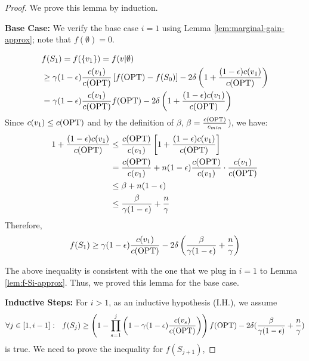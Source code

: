 \documentclass[10pt]{article} %
\theoremstyle{remark}
\newcommand{\OPT}{{\rm OPT}}
\begin{document}
\begin{proof} 
We prove this lemma by induction. 


\textbf{Base Case: }
We verify the base case $i=1$ using Lemma \ref{lem:marginal-gain-approx}; note that
$f(\emptyset) = 0$.

\begin{align*}
    &f(S_1) = f(\{v_1\})=f(v|\emptyset) \\
    &\geq \gamma(1-\epsilon)\frac{c(v_1)}{c(\OPT)} \left[ f(\OPT)-f(S_{0})\right] - 2\delta  \left( 1+\frac{(1-\epsilon)c(v_1)}{ c(\OPT)} \right)\\
    &=\gamma(1-\epsilon)\frac{c(v_1)}{c(\OPT)}  f(\OPT) - 2\delta  \left( 1+\frac{(1-\epsilon)c(v_1)}{ c(\OPT)} \right)
\end{align*}
Since $c(v_1) \leq c(\OPT)$ and by the definition of $\beta$, $\beta = \frac{c(\OPT)}{c_{min}}$), we have:
\begin{align*}
    1+\frac{(1-\epsilon)c(v_1)}{ c(\OPT)} &\leq \frac{c(\OPT)}{c(v_1)} \left[ 1+\frac{(1-\epsilon)c(v_1)}{ c(\OPT)} \right]  \\
    &= \frac{c(\OPT)}{c(v_1)} + n(1-\epsilon) \frac{c(\OPT)}{c(v_1)}\cdot \frac{c(v_1)}{c(\OPT)}\\
    &\leq \beta + n(1-\epsilon) \\
    &\leq \frac{\beta}{\gamma(1-\epsilon)}+ \frac{n}{\gamma}
\end{align*}
Therefore, \[f(S_1) \geq \gamma(1-\epsilon)\frac{c(v_1)}{c(\OPT)} - 2\delta\left(\frac{\beta}{\gamma(1-\epsilon)}+ \frac{n}{\gamma}\right)\]

The above inequality is consistent with the one that we plug in $i=1$ to Lemma \ref{lem:f-Si-approx}. Thus, we proved this lemma for the base case.


\textbf{Inductive Steps: }
For $i>1$, as an inductive hypothesis (I.H.), we assume
\[\forall j \in [1, i -1]:~~
 f(S_{j}) \geq \left(   1- \prod_{s=1}^{j} \left(1- \gamma(1-\epsilon) \frac{c(v_s)}{c(\OPT)} \right) \right) f(\OPT) - 2\delta(\frac{\beta}{\gamma(1-\epsilon)}+\frac{n}{\gamma})
\]
is true. We need to prove the inequality for $f(S_{j+1})$, 


\end{proof}
\end{document}
